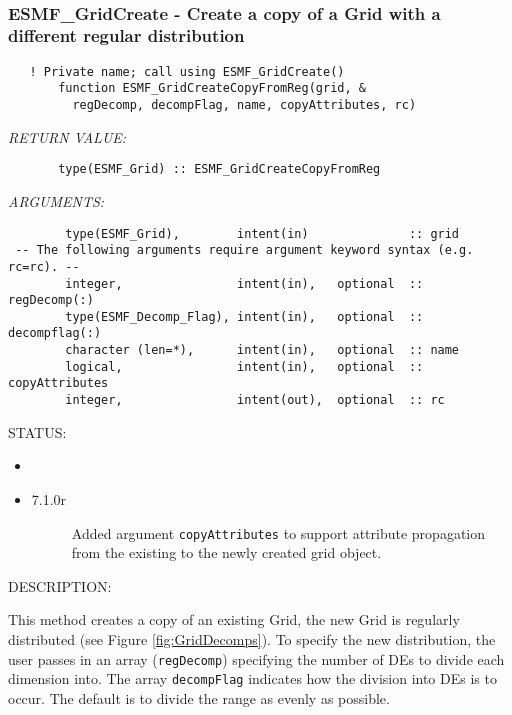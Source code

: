 
\mbox{}\hrulefill\ 
 
\subsubsection [ESMF\_GridCreate] {ESMF\_GridCreate - Create a copy of a Grid with a different regular distribution}


 
\begin{verbatim}   ! Private name; call using ESMF_GridCreate()
       function ESMF_GridCreateCopyFromReg(grid, &
         regDecomp, decompFlag, name, copyAttributes, rc)
 \end{verbatim}{\em RETURN VALUE:}
\begin{verbatim}       type(ESMF_Grid) :: ESMF_GridCreateCopyFromReg\end{verbatim}{\em ARGUMENTS:}
\begin{verbatim}        type(ESMF_Grid),        intent(in)              :: grid
 -- The following arguments require argument keyword syntax (e.g. rc=rc). --
        integer,                intent(in),   optional  :: regDecomp(:)
        type(ESMF_Decomp_Flag), intent(in),   optional  :: decompflag(:)
        character (len=*),      intent(in),   optional  :: name
        logical,                intent(in),   optional  :: copyAttributes
        integer,                intent(out),  optional  :: rc\end{verbatim}
{\sf STATUS:}
   \begin{itemize}
   \item{}
   \item{}
   \begin{description}
   \item[7.1.0r] Added argument {\tt copyAttributes} to support attribute
                 propagation from the existing to the newly created grid object.
   \end{description}
   \end{itemize}
  
{\sf DESCRIPTION:\\ }


  
   This method creates a copy of an existing Grid, the new Grid is
   regularly distributed (see Figure \ref{fig:GridDecomps}).
   To specify the new distribution, the user passes in an array
   ({\tt regDecomp}) specifying the number of DEs to divide each
   dimension into. The array {\tt decompFlag} indicates how the division into DEs is to
   occur.  The default is to divide the range as evenly as possible.
  
